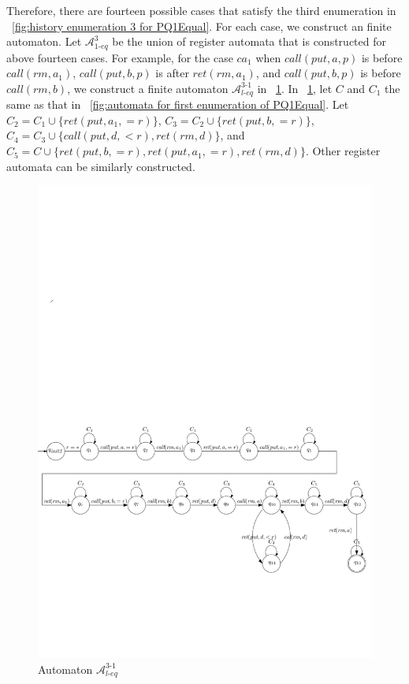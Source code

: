 Therefore, there are fourteen possible cases that satisfy the third enumeration in \figurename~\ref{fig:history enumeration 3 for PQ1Equal}. For each case, we construct an finite automaton. Let $\mathcal{A}_{\textit{1-eq}}^{3}$ be the union of register automata that is constructed for above fourteen cases. For example, for the case $\textit{ca}_1$ when $\textit{call}(\textit{put},a,p)$ is before $\textit{call}(\textit{rm},a_1)$, $\textit{call}(\textit{put},b,p)$ is after $\textit{ret}(\textit{rm},a_1)$, and $\textit{call}(\textit{put},b,p)$ is before $\textit{call}(\textit{rm},b)$, we construct a finite automaton $\mathcal{A}_{\textit{l-eq}}^{\textit{3-1}}$ in \figurename~\ref{fig:automata for ca1 of third enumeration of Rpr2}. In \figurename~\ref{fig:automata for ca1 of third enumeration of Rpr2}, let $C$ and $C_1$ the same as that in \figurename~\ref{fig:automata for first enumeration of PQ1Equal}. Let $C_2 = C_1 \cup \{ \textit{ret}(\textit{put},a_1,=r) \}$, $C_3 = C_2 \cup \{ \textit{ret}(\textit{put},b,=r) \}$, $C_4 = C_3 \cup \{ \textit{call}(\textit{put},d,<r), \textit{ret}(\textit{rm},d) \}$, and $C_5 = C \cup \{ \textit{ret}(\textit{put},b,=r), \textit{ret}(\textit{put},a_1,=r), \textit{ret}(\textit{rm},d) \}$. Other register automata can be similarly constructed.

\begin{figure}[htbp]
  \centering
  \includegraphics[width=0.8 \textwidth]{figures/PIC_AUTO_PQ1Equ-3-1.pdf}
  \caption{Automaton $\mathcal{A}_{\textit{l-eq}}^{\textit{3-1}}$}
  \label{fig:automata for ca1 of third enumeration of Rpr2}
\end{figure}

